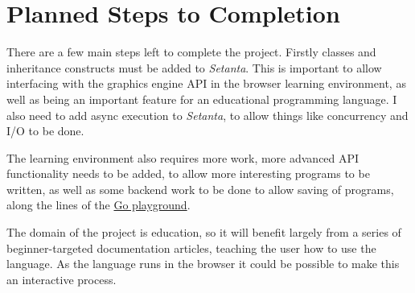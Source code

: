 \documentclass[11pt]{extarticle}
\newcommand{\Setanta}{\emph{Setanta}}
\begin{document}
    \section{Planned Steps to Completion}

    There are a few main steps left to complete the project. Firstly classes and inheritance constructs must be added to \Setanta{}. This is important to allow interfacing with the graphics engine API in the browser learning environment, as well as being an important feature for an educational programming language. I also need to add async execution to \Setanta{}, to allow things like concurrency and I/O to be done.

    The learning environment also requires more work, more advanced API functionality needs to be added, to allow more interesting programs to be written, as well as some backend work to be done to allow saving of programs, along the lines of the \href{https://play.golang.org}{Go playground}.

    The domain of the project is education, so it will benefit largely from a series of beginner-targeted documentation articles, teaching the user how to use the language. As the language runs in the browser it could be possible to make this an interactive process.
\end{document}
